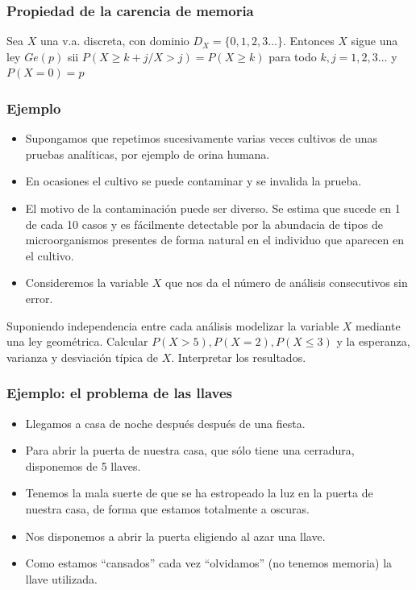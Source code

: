\begin{frame}
    \frametitle{Propiedad de la carencia de memoria}
    Sea $X$ una v.a. discreta, con dominio $D_X=\{0,1,2,3\ldots\}$. Entonces
    $X$ sigue una ley $Ge(p)$ sii $P(X\geq k+j/X> j)=P(X\geq k)$ para
    todo $k,j=1,2,3\ldots$ y $P(X=0)=p$
 \end{frame}

\begin{frame}
\frametitle{Ejemplo}
\begin{itemize}
\item Supongamos que repetimos sucesivamente varias veces cultivos  de unas pruebas analíticas, por ejemplo de orina humana.
\item  En ocasiones el cultivo se puede contaminar y se invalida la prueba. 
\item El motivo de la contaminación puede ser diverso. Se estima que sucede en 1 de cada 10 casos y es fácilmente detectable por la abundacia de tipos de microorganismos presentes de forma natural en el individuo que aparecen en el cultivo. 
\item Consideremos la variable $X$ que nos da el número de análisis consecutivos sin error.
\end{itemize}

Suponiendo independencia entre cada análisis modelizar la variable $X$ mediante una ley geométrica. Calcular $P(X>5), P(X=2), P(X\leq 3)$ y la esperanza, varianza y desviación típica de $X$. Interpretar los resultados.

\end{frame}

\begin{frame}
\frametitle{Ejemplo: el problema de las llaves}
\begin{itemize}
\item Llegamos a casa  de noche  después  después de una fiesta. 
\item Para abrir la puerta de nuestra casa, que sólo tiene una cerradura, disponemos de  5 llaves.
\item Tenemos la mala suerte de que se ha estropeado la luz en la puerta de nuestra casa, de forma que estamos totalmente a oscuras.
\item Nos disponemos a  abrir la puerta eligiendo al azar una llave.
\item  Como estamos ``cansados'' cada vez ``olvidamos'' (no tenemos memoria) la llave utilizada.
\end{itemize}
\end{frame}

